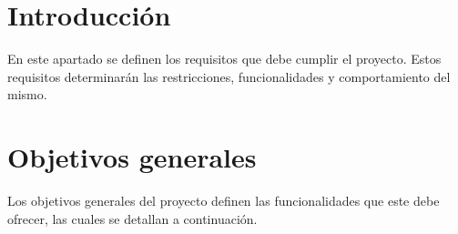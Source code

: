 
\section{Introducción}
En este apartado se definen los requisitos que debe cumplir el proyecto. Estos requisitos determinarán las restricciones, funcionalidades y comportamiento del mismo.


\section{Objetivos generales}
Los objetivos generales del proyecto definen las funcionalidades que este debe ofrecer, las cuales se detallan a continuación.

